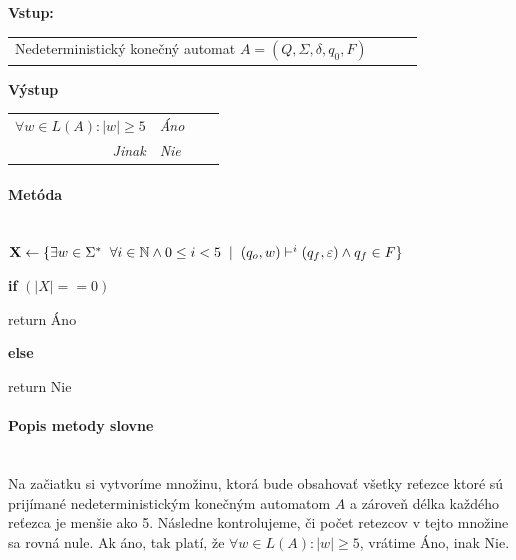 \documentclass[11pt,a4paper]{article}
\begin{document}
\textbf{Vstup: }\\[-1.8em]
\begin{center}
\begin{minipage}{0.85\textwidth}
    \begin{tabular}{rlcl}
        Nedeterministický konečný automat $A = (Q, \Sigma, \delta, q_0 , F)$
    \end{tabular}
\end{minipage}
\end{center}


\textbf{Výstup}\\[-1.8em]
\begin{center}
\begin{minipage}{0.85\textwidth}
    \begin{tabular}{r|lcl}
        \textit{$\forall w \in L(A) : |w| \ge 5$ }  & \textit{Áno}\\
        \textit{Jinak}  & \textit{Nie}\\
    \end{tabular}
\end{minipage}
\end{center}

\paragraph{Metóda}\mbox{{}}\\

$\textbf{X} \gets \{ \exists w \in \Sigma^* \hspace{0.2cm} \forall i \in \mathbb{N} \land 0 \le i < 5 \hspace{0.2cm} | \hspace{0.2cm} (q_o, w) \vdash^i (q_f, \varepsilon) \land q_f \in F \}$

\textbf{if} $(|X| == 0)$

\hspace{0.55cm} return Áno

\textbf{else}

\hspace{0.55cm} return Nie


\paragraph{Popis metody slovne}\mbox{{}}\\
Na začiatku si vytvoríme množinu, ktorá bude obsahovať všetky reťezce ktoré sú prijímané nedeterministickým konečným automatom $A$ a zároveň délka každého reťezca je menšie ako 5.
Následne kontrolujeme, či počet retezcov v tejto množine sa rovná nule. Ak áno, tak platí, že $\forall w \in L(A) : |w| \ge 5$, vrátime Áno, inak Nie.
\end{document}
